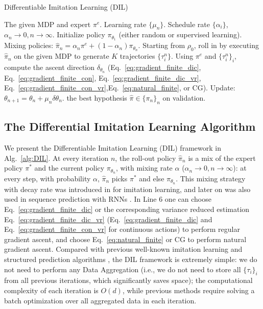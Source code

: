 \documentclass{article}
\begin{document}
\begin{algorithm}[tb]
 \caption{Differentiable Imitation Learning (DIL)}
 \begin{algorithmic}[1]
 \label{alg:DIL}
  The given MDP and expert $\pi^e$.  Learning rate $\{\mu_n\}$. Schedule rate $\{\alpha_i\}$, $\alpha_n\to0, n\to\infty$. 
 \STATE Initialize policy $\pi_{\theta_1}$ (either random or supervised learning). 
    \STATE Mixing policies: $\hat{\pi}_n= \alpha_n\pi^e + (1-\alpha_n)\pi_{\theta_n}$.
    \STATE \label{line:rolling_in} Starting from $\rho_0$, roll in by executing $\hat{\pi}_{n}$ on the given MDP to generate $K$ trajectories $\{\tau_i^n\}$.
    \STATE Using $\pi^e$ and $\{\tau_i^n\}_i$, compute the ascent direction $\delta_{\theta_n}$ (Eq.~\ref{eq:gradient_finite_dic}, Eq.~\ref{eq:gradient_finite_con},
    Eq.~\ref{eq:gradient_finite_dic_vr}, Eq.~\ref{eq:gradient_finite_con_vr},Eq.~\ref{eq:natural_finite}, or CG).
    \label{line:gradient_compute}
    \STATE Update: $\theta_{n+1} = \theta_n + \mu_n\delta\theta_n$.
\ENDFOR
  the best hypothesis $\hat{\pi}\in\{\pi_n\}_n$ on validation.
 \end{algorithmic}
\end{algorithm}


\subsection{The Differential Imitation Learning Algorithm}
We present the Differentiable Imitation Learning (DIL) framework in Alg.~\ref{alg:DIL}. At every iteration $n$, the roll-out policy $\hat{\pi}_n$ is a mix of the expert policy $\pi^*$ and the current policy $\pi_{\theta_n}$, with mixing rate $\alpha$ ($\alpha_n\to0, n\to\infty$): at every step, with probability $\alpha$, $\hat{\pi}_n$ picks $\pi^*$ and else $\pi_{\theta_n}$. This mixing strategy with decay rate was introduced in \cite{Ross2011_AISTATS} for imitation learning, and later on was also used in sequence prediction with RNNs \cite{bengio2015scheduled}. In Line 6 %
one can choose Eq.~\ref{eq:gradient_finite_dic} or the corresponding variance reduced estimation Eq.~\ref{eq:gradient_finite_dic_vr} (Eq.~\ref{eq:gradient_finite_dic} and Eq.~\ref{eq:gradient_finite_con_vr} for continuous actions) to perform regular gradient ascent, and choose Eq.~\ref{eq:natural_finite} or CG to perform natural gradient ascent. Compared with previous well-known imitation learning and structured prediction algorithms \cite{Ross2011_AISTATS,ross2014reinforcement,chang2015learning}, the DIL framework is extremely simple: we do not need to perform any Data Aggregation (i.e., we do not need to store all $\{\tau_i\}_i$ from all previous iterations, which significantly saves space); the computational complexity of each iteration is $O(d)$, while previous methods require solving a batch optimization over all aggregated data in each iteration. 
\end{document}
